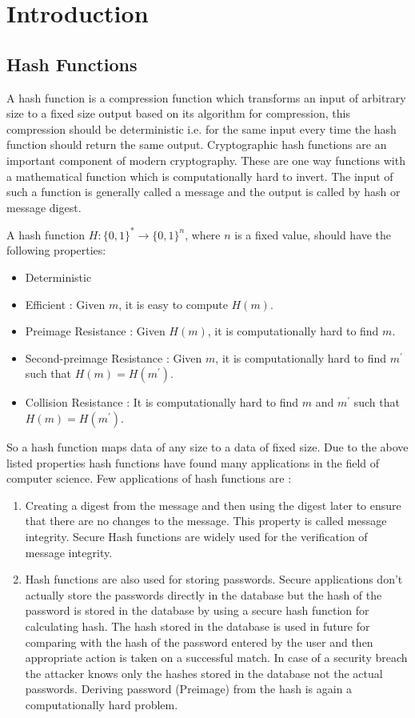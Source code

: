 \chapter{Introduction}
\label{chap:intro}

\section{Hash Functions}

A hash function is a compression function which transforms an input of arbitrary size to a fixed size output based on its algorithm for compression, this compression should be deterministic i.e. for the same input every time the hash function should return the same output. Cryptographic hash functions are an important component of modern cryptography. These are one way functions with a mathematical function which is computationally hard to invert. The input of such a function is generally called a message and the output is called by hash or message digest.

A hash function $H:\{0,1\}^* \rightarrow \{0,1\}^n $, where $n$ is a fixed value, should have the following properties: 
\begin{itemize}\setlength\itemindent{20pt}
		\item Deterministic
    \item Efficient : Given $m$, it is easy to compute $H(m)$.
        \item Preimage Resistance : Given $H(m)$, it is computationally hard to find $m$.
        \item Second-preimage Resistance : Given $m$, it is computationally hard to find $m^\prime$ such that $H(m)=H(m^\prime)$.
        \item Collision Resistance : It is computationally hard to find $m$ and $m^\prime$ such that $H(m)=H(m^\prime)$.
\end{itemize}

So a hash function maps data of any size to a data of fixed size. Due to the above listed properties hash functions have found many applications in the field of computer science. Few applications of hash functions are :
\begin{enumerate}
	\item Creating a digest from the message and then using the digest later to ensure that there are no changes to the message. This property is called message integrity. Secure Hash functions are widely used for the verification of message integrity.
	\item Hash functions are also used for storing passwords. Secure applications don't actually store the passwords directly in the database but the hash of the password is stored in the database by using a secure hash function for calculating hash. The hash stored in the database is used in future for comparing with the hash of the password entered by the user and then appropriate action is taken on a successful match. In case of a security breach the attacker knows only the hashes stored in the database not the actual passwords. Deriving password (Preimage) from the hash is again a computationally hard problem.
\end{enumerate}

